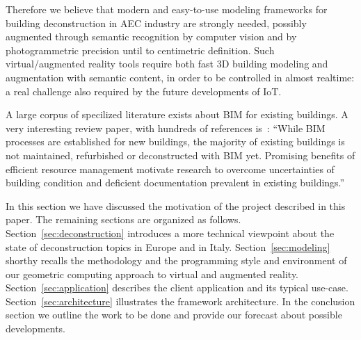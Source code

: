 Therefore we believe that modern and easy-to-use modeling frameworks for building deconstruction in AEC industry are strongly needed, possibly augmented through semantic recognition by computer vision and by photogrammetric precision until to centimetric definition. Such virtual/augmented reality tools require both fast 3D building modeling and augmentation with semantic content, in order to be controlled in almost realtime: a real challenge also required by the future developments of IoT.
 
A large corpus of specilized literature exists about BIM for existing buildings. A very interesting review paper, with hundreds of references is~\cite{Volk2014109}:  ``While BIM processes are established for new buildings, the majority of existing buildings is not maintained, refurbished or deconstructed with BIM yet. Promising benefits of efficient resource management motivate research to overcome uncertainties of building condition and deficient documentation prevalent in existing buildings.''
 
In this section we have discussed the motivation of the project described in this paper. The remaining sections are organized as follows.
Section~\ref{sec:deconstruction} introduces a more technical viewpoint about the state of deconstruction topics in Europe and in Italy.
Section~\ref{sec:modeling} shorthy recalls the methodology and the programming style and environment of our geometric computing approach to virtual and augmented reality.
Section~\ref{sec:application} describes the client application and its typical use-case. 
Section~\ref{sec:architecture} illustrates the framework architecture. 
In the conclusion section we outline the work to be done and provide our forecast about possible developments.
